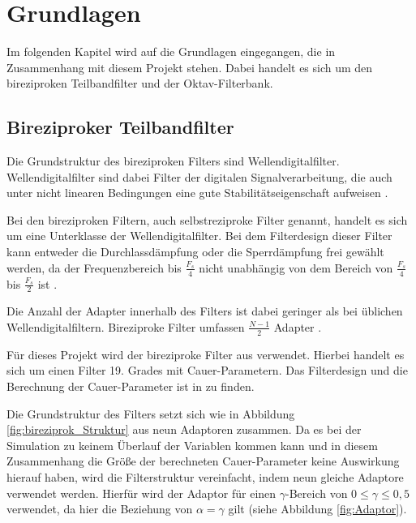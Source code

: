 %

\section{Grundlagen}
Im folgenden Kapitel wird auf die Grundlagen eingegangen, die in Zusammenhang mit diesem Projekt stehen. Dabei handelt es sich um den bireziproken Teilbandfilter und der Oktav-Filterbank.

\subsection{Bireziproker Teilbandfilter}
Die Grundstruktur des bireziproken Filters sind Wellendigitalfilter. Wellendigitalfilter sind dabei Filter der digitalen Signalverarbeitung, die auch unter nicht linearen Bedingungen eine gute Stabilitätseigenschaft aufweisen \cite[vgl.][S. 68]{gaszi1983}.\par
Bei den bireziproken Filtern, auch selbstreziproke Filter genannt, handelt es sich um eine Unterklasse der Wellendigitalfilter. Bei dem Filterdesign dieser Filter kann entweder die Durchlassdämpfung oder die Sperrdämpfung frei gewählt werden, da der Frequenzbereich bis $\frac{F_s}{4}$ nicht unabhängig von dem Bereich von $\frac{F_s}{4}$ bis $\frac{F_s}{2}$ ist \cite[vgl.][S. 72]{gaszi1983}.\par
Die Anzahl der Adapter innerhalb des Filters ist dabei geringer als bei üblichen Wellendigitalfiltern. Bireziproke Filter umfassen $\frac{N - 1}{2}$ Adapter \cite[vgl.][S. 73]{gaszi1983}.\par
Für dieses Projekt wird der bireziproke Filter aus \cite{gaszi1983} verwendet. Hierbei handelt es sich um einen Filter 19. Grades mit Cauer-Parametern. Das Filterdesign und die Berechnung der Cauer-Parameter ist in \cite[][S. 74]{gaszi1983} zu finden.\par
Die Grundstruktur des Filters setzt sich wie in Abbildung \ref{fig:bireziprok_Struktur} aus neun Adaptoren zusammen. Da es bei der Simulation zu keinem Überlauf der Variablen kommen kann und in diesem Zusammenhang die Größe der berechneten Cauer-Parameter keine Auswirkung hierauf haben, wird die Filterstruktur vereinfacht, indem neun gleiche Adaptore verwendet werden. Hierfür wird der Adaptor für einen $\gamma$-Bereich von $0\leq\gamma\leq0,5$ verwendet, da hier die Beziehung von $\alpha=\gamma$ gilt (siehe Abbildung \ref{fig:Adaptor}).
